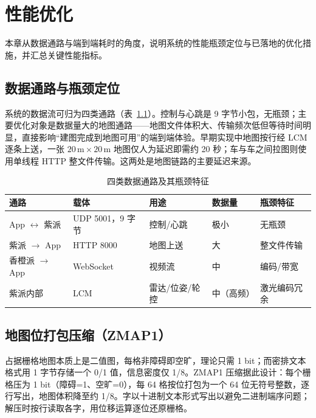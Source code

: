 \chapter{性能优化}
\label{ch:performance}

本章从数据通路与端到端耗时的角度，说明系统的性能瓶颈定位与已落地的优化措施，并汇总关键性能指标。

\section{数据通路与瓶颈定位}
\label{sec:data-pathways}

系统的数据流可归为四类通路（表~\ref{tab:data-pathways}）。控制与心跳是 9 字节小包，无瓶颈；主要优化对象是数据量大的地图通路——地图文件体积大、传输频次低但等待时间明显，直接影响“建图完成到地图可用”的端到端体验。早期实现中地图按行经 LCM 逐条上送，一张 $20\,\text{m}\times20\,\text{m}$ 地图仅人为延迟即需约 20 秒；车与车之间拉图则使用单线程 HTTP 整文件传输。这两处是地图链路的主要延迟来源。

\begin{table}[htbp]
\centering
\caption{四类数据通路及其瓶颈特征}
\label{tab:data-pathways}
\begin{tabularx}{\textwidth}{p{2.5cm}p{2cm}p{2cm}p{2cm}X}
\toprule
\textbf{通路} & \textbf{载体} & \textbf{用途} & \textbf{数据量} & \textbf{瓶颈特征} \\
\midrule
App $\leftrightarrow$ 紫派 & UDP 5001，9 字节 & 控制/心跳 & 极小 & 无瓶颈 \\
紫派 $\to$ App & HTTP 8000 & 地图上送 & 大 & 整文件传输 \\
香橙派 $\to$ App & WebSocket & 视频流 & 中 & 编码/带宽 \\
紫派内部 & LCM & 雷达/位姿/轮控 & 中（高频） & 激光编码冗余 \\
\bottomrule
\end{tabularx}
\end{table}

\section{地图位打包压缩（ZMAP1）}
\label{sec:bit-packing}

占据栅格地图本质上是二值图，每格非障碍即空旷，理论只需 1 bit；而密排文本格式用 1 字节存储一个 0/1 值，信息密度仅 1/8。ZMAP1 压缩据此设计：每个栅格压为 1 bit（障碍=1、空旷=0），每 64 格按位打包为一个 64 位无符号整数，逐行写出，地图体积降至约 1/8。字以十进制文本形式写出以避免二进制端序问题；解压时按行读取各字，用位移运算逐位还原栅格。

